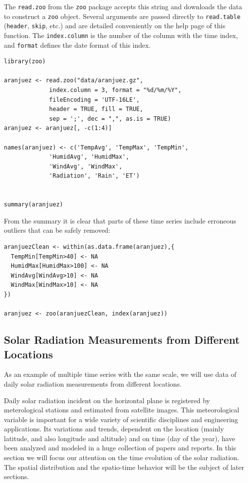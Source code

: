 The \texttt{read.zoo} from the \texttt{zoo} package accepts this string and
downloads the data to construct a \texttt{zoo} object. Several
arguments are passed directly to \texttt{read.table} (\texttt{header}, \texttt{skip},
etc.) and are detailed conveniently on the help page of this
function. The \texttt{index.column} is the number of the column with the
time index, and \texttt{format} defines the date format of this index.


\lstset{language=R,numbers=none}
\begin{lstlisting}
library(zoo)

aranjuez <- read.zoo("data/aranjuez.gz",
		     index.column = 3, format = "%d/%m/%Y",
		     fileEncoding = 'UTF-16LE',
		     header = TRUE, fill = TRUE,
		     sep = ';', dec = ",", as.is = TRUE)
aranjuez <- aranjuez[, -c(1:4)]

names(aranjuez) <- c('TempAvg', 'TempMax', 'TempMin',
		     'HumidAvg', 'HumidMax',
		     'WindAvg', 'WindMax',
		     'Radiation', 'Rain', 'ET')


summary(aranjuez)
\end{lstlisting}


From the summary it is clear that parts of these time series include erroneous outliers that can be
safely removed:
\lstset{language=R,numbers=none}
\begin{lstlisting}
aranjuezClean <- within(as.data.frame(aranjuez),{
  TempMin[TempMin>40] <- NA
  HumidMax[HumidMax>100] <- NA
  WindAvg[WindAvg>10] <- NA
  WindMax[WindMax>10] <- NA
})

aranjuez <- zoo(aranjuezClean, index(aranjuez))
\end{lstlisting}

\subsection{Solar Radiation Measurements from Different Locations}
\label{sec-1-2}
As an example of multiple time series with the same scale, we will use
data of daily solar radiation measurements from different locations.


Daily solar radiation incident on the horizontal plane is registered
by meterological stations and estimated from satellite images. This
meteorological variable is important for a wide variety of scientific
disciplines and engineering applications. Its variations and trends,
dependent on the location (mainly latitude, and also longitude and
altitude) and on time (day of the year), have been analyzed and
modeled in a huge collection of papers and reports. In this section
we will focus our attention on the time evolution of the solar
radiation. The spatial distribution and the spatio-time behavior will
be the subject of later sections.

